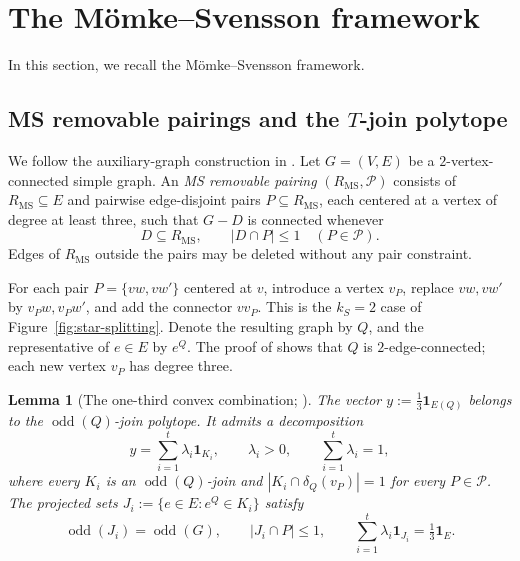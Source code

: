 \documentclass[11pt]{amsart}
\DeclareMathOperator{\odd}{odd}
\newcommand{\1}{\mathbbm{1}}
\newtheorem{lemma}[theorem]{Lemma}
\begin{document}
\FloatBarrier
\section{The M\"omke--Svensson framework}
\label{sec:MS-comparison}

In this section, we recall the M\"omke--Svensson framework.
\subsection{\textsc{MS} removable pairings and the \texorpdfstring{$T$}{T}-join polytope}

We follow the auxiliary-graph construction in
\cite[Section~12.2]{TraubVygen}.
Let $G=(V,E)$ be a $2$-vertex-connected simple graph.
An \emph{\textsc{MS} removable pairing} $(R_{\mathrm{MS}},\mathcal P)$ consists
of $R_{\mathrm{MS}}\subseteq E$ and pairwise edge-disjoint pairs
$P\subseteq R_{\mathrm{MS}}$, each centered at a vertex of degree
at least three, such that $G-D$ is connected whenever
\[
 D\subseteq R_{\mathrm{MS}},\qquad |D\cap P|\le1
 \quad(P\in\mathcal P).
\]
Edges of $R_{\mathrm{MS}}$ outside the pairs may be deleted without any pair constraint.

For each pair $P=\{vw,vw'\}$ centered at $v$, introduce a
vertex $v_P$, replace $vw,vw'$ by $v_Pw,v_Pw'$, and add
the connector $vv_P$. This is the $k_S=2$ case
of Figure~\ref{fig:star-splitting}. Denote the resulting graph by
$Q$, and the representative of $e\in E$ by $e^Q$.
The proof of \cite[Theorem~12.3]{TraubVygen} shows that $Q$ is
$2$-edge-connected; each new vertex $v_P$ has degree three.



\begin{lemma}[The one-third convex combination; {\cite[proof of Theorem~12.3]{TraubVygen}}]
\label{lem:MS-distribution}
\label{lem:MS-convex-combination}
{The vector $y:=\tfrac13\mathbf{1}_{E(Q)}$
belongs to the $\odd(Q)$-join polytope.} It admits a decomposition
\begin{equation}
\label{eq:MS-join-decomposition}
 y=\sum_{i=1}^{t}\lambda_i\mathbf{1}_{K_i},
 \qquad \lambda_i>0,\qquad \sum_{i=1}^{t}\lambda_i=1,
\end{equation}
where every $K_i$ is an $\odd(Q)$-join and
$|K_i\cap\delta_Q(v_P)|=1$ for every $P\in\mathcal P$.
The projected sets $J_i:=\{e\in E:e^Q\in K_i\}$ satisfy
\begin{equation}
\label{eq:MS-projected-decomposition}
 \odd(J_i)=\odd(G),\qquad |J_i\cap P|\le1,
 \qquad \sum_{i=1}^{t}\lambda_i\mathbf{1}_{J_i}
       =\tfrac13\mathbf{1}_E.
\end{equation}
\end{lemma}
\end{document}
